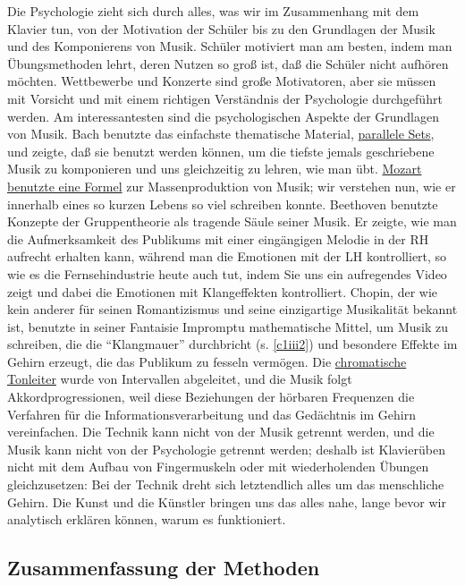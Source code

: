 Die Psychologie zieht sich durch alles, was wir im Zusammenhang mit dem Klavier tun, von der Motivation der Schüler bis zu den Grundlagen der Musik und des Komponierens von Musik.
Schüler motiviert man am besten, indem man Übungsmethoden lehrt, deren Nutzen so groß ist, daß die Schüler nicht aufhören möchten.
Wettbewerbe und Konzerte sind große Motivatoren, aber sie müssen mit Vorsicht und mit einem richtigen Verständnis der Psychologie durchgeführt werden.
Am interessantesten sind die psychologischen Aspekte der Grundlagen von Musik.
Bach benutzte das einfachste thematische Material, \hyperref[c1iii20ps]{parallele Sets}, und zeigte, daß sie benutzt werden können, um die tiefste jemals geschriebene Musik zu komponieren und uns gleichzeitig zu lehren, wie man übt.
\hyperref[c1iv4]{Mozart benutzte eine Formel} zur Massenproduktion von Musik;
wir verstehen nun, wie er innerhalb eines so kurzen Lebens so viel schreiben konnte.
Beethoven benutzte Konzepte der Gruppentheorie als tragende Säule seiner Musik.
Er zeigte, wie man die Aufmerksamkeit des Publikums mit einer eingängigen Melodie in der RH aufrecht erhalten kann, während man die Emotionen mit der LH kontrolliert, so wie es die Fernsehindustrie heute auch tut, indem Sie uns ein aufregendes Video zeigt und dabei die Emotionen mit Klangeffekten kontrolliert.
Chopin, der wie kein anderer für seinen Romantizismus und seine einzigartige Musikalität bekannt ist, benutzte in seiner Fantaisie Impromptu mathematische Mittel, um Musik zu schreiben, die die \enquote{Klangmauer} durchbricht (s. \hyperref[c1iii2]{\autoref{c1iii2}}) und besondere Effekte im Gehirn erzeugt, die das Publikum zu fesseln vermögen.
Die \hyperref[c2_2]{chromatische Tonleiter} wurde von Intervallen abgeleitet, und die Musik folgt Akkordprogressionen, weil diese Beziehungen der hörbaren Frequenzen die Verfahren für die Informationsverarbeitung und das Gedächtnis im Gehirn vereinfachen.
Die Technik kann nicht von der Musik getrennt werden, und die Musik kann nicht von der Psychologie getrennt werden; deshalb ist Klavierüben nicht mit dem Aufbau von Fingermuskeln oder mit wiederholenden Übungen gleichzusetzen: Bei der Technik dreht sich letztendlich alles um das menschliche Gehirn.
Die Kunst und die Künstler bringen uns das alles nahe, lange bevor wir analytisch erklären können, warum es funktioniert.


\subsection{Zusammenfassung der Methoden}
\label{c1iii22}

